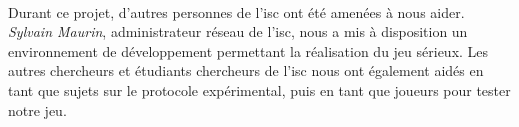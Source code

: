 \paragraph{}Durant ce projet, d'autres personnes de l'\gls{isc} ont été amenées à nous aider. \emph{Sylvain Maurin}, administrateur réseau de l'\gls{isc}, nous a mis à disposition un
environnement de développement permettant la réalisation du jeu sérieux. Les autres chercheurs et étudiants chercheurs de l'\gls{isc} nous ont également aidés en tant que sujets sur
le protocole expérimental, puis en tant que joueurs pour tester notre jeu.
